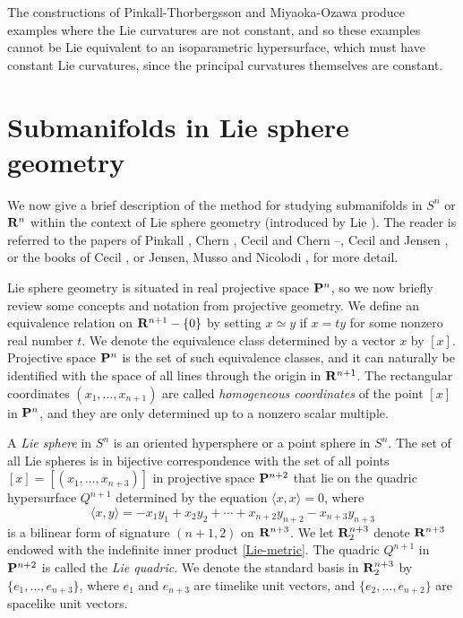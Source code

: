 \documentclass[12pt]{article}
\begin{document}
The constructions of Pinkall-Thorbergsson and Miyaoka-Ozawa produce examples where 
the Lie curvatures are not constant, and so these examples cannot be Lie  equivalent to an isoparametric hypersurface, which must have constant Lie curvatures,
since the principal curvatures themselves are constant. 



\section{Submanifolds in Lie sphere geometry}
\label{sec:2}
We now give a brief description of the method for studying submanifolds
in $S^n$ or ${\bf R}^n$ within the context of Lie sphere geometry
(introduced by Lie \cite{Lie}).  The reader is referred to the papers of
Pinkall \cite{P4}, Chern \cite{Chern}, Cecil and Chern \cite{CC1}--\cite{CC2}, Cecil and Jensen \cite{CJ2},
or the books of Cecil \cite{Cec1}, or
Jensen, Musso and Nicolodi \cite{Jensen-Musso-Nicolodi}, for more detail.


Lie sphere geometry is situated in real projective space ${\bf P}^n$,
so we now briefly review some concepts and notation from projective geometry.
We define an equivalence relation on ${\bf R}^{n+1} - \{0\}$ by setting
$x \simeq y$ if $x = ty$ for some nonzero real number $t$.  We denote
the equivalence class determined by a vector $x$ by $[x]$.  Projective
space ${\bf P}^n$ is the set of such equivalence classes, and it can
naturally be identified with the space of all lines through the origin
in ${\bf R}^{n+1}$.  The rectangular coordinates $(x_1, \ldots, x_{n+1})$
are called {\em homogeneous coordinates}
of the point $[x]$ in ${\bf P}^n$, and they
are only determined up to a nonzero scalar multiple.  

A {\em Lie sphere} in $S^n$ is an oriented hypersphere or a point sphere in $S^n$.
The set of all Lie spheres
is in bijective correspondence with the set of all points $[x] = [(x_1,\ldots,x_{n+3})]$
in projective space ${\bf P}^{n+2}$ that lie
on the quadric hypersurface $Q^{n+1}$ 
determined by the equation 
$\langle x, x \rangle = 0$, where
\begin{equation}
\label{Lie-metric}
\langle x, y \rangle = -x_1 y_1 + x_2 y_2 + \cdots +x_{n+2} y_{n+2} - x_{n+3} y_{n+3}
\end{equation}
is a bilinear form of signature $(n+1,2)$ on ${\bf R}^{n+3}$.  
We let  ${\bf R}^{n+3}_2$ denote ${\bf R}^{n+3}$ endowed with
the indefinite inner product \eqref{Lie-metric}.  The quadric 
$Q^{n+1}$ in  ${\bf P}^{n+2}$  is called the {\em Lie quadric}.
We denote the standard basis in ${\bf R}^{n+3}_2$  by $\{e_1,\ldots,e_{n+3}\}$, where $e_1$ and $e_{n+3}$
are timelike unit vectors, and $\{e_2,\ldots,e_{n+2}\}$ are spacelike unit vectors.
\end{document}
